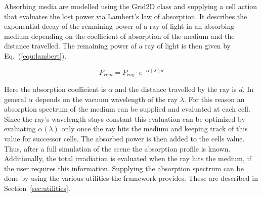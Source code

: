 \documentclass[a4paper,10pt]{article}
\newcommand{\equref}[1]{Eq.~(\ref{#1})}
\newcommand{\secref}[1]{Section~\ref{#1}}
\begin{document}
    Absorbing media are modelled using the Grid2D class and
    supplying a cell action that evaluates the lost power via
    Lambert's law of absorption.
    It describes the exponential decay of the remaining power
    of a ray of light in an absorbing medium depending on
    the coefficient of absorption of the medium and the 
    distance travelled.
    The remaining power of a ray of light is then given by
    \equref{equ:lambert}.

    \begin{equation}
    \label{equ:lambert}
        P_{rem} = P_{ray} \cdot e^{-\alpha(\lambda) d}
    \end{equation}

    Here the absorption coefficient is $\alpha$ and the distance
    travelled by the ray is $d$. 
    In general $\alpha$ depends on the vacuum wavelength of the ray
    $\lambda$.
    For this reason an absorption spectrum of the medium can be supplied
    and evaluated at each cell.
    Since the ray's wavelength stays constant this evaluation can be
    optimized by evaluating $\alpha(\lambda)$ only once the ray hits the
    medium and keeping track of this value for successor cells.
    The absorbed power is then added to the cells value.
    Thus, after a full simulation of the scene the absorption profile
    is known.
    Additionally, the total irradiation is evaluated when the ray hits
    the medium, if the user requires this information.
    Supplying the absorption spectrum can be done by using the various
    utilities the framework provides.
    These are described in \secref{sec:utilities}.
\end{document}
